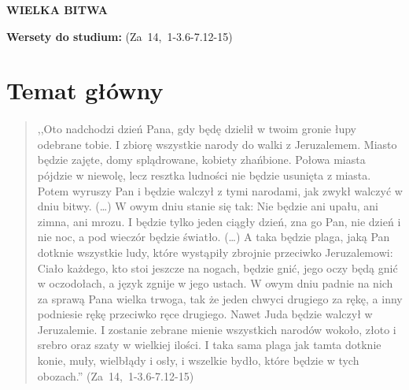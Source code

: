 \documentclass[10pt,a4paper,oneside]{article}
\begin{document}
\centerline{\textbf{\MakeUppercase{Wielka bitwa}}}
\begin{center}
\textbf{Wersety do studium:} \mbox{(Za 14, 1-3.6-7.12-15)}
\end{center}
\section{Temat główny}
\paragraph{}
\begin{quote}
,,Oto nadchodzi dzień Pana, gdy będę dzielił w twoim gronie łupy odebrane tobie. I zbiorę wszystkie narody do walki z Jeruzalemem. Miasto będzie zajęte, domy splądrowane, kobiety zhańbione. Połowa miasta pójdzie w niewolę, lecz resztka ludności nie będzie usunięta z miasta. Potem wyruszy Pan i będzie walczył z tymi narodami, jak zwykł walczyć w dniu bitwy. (\ldots) W owym dniu stanie się tak: Nie będzie ani upału, ani zimna, ani mrozu. I będzie tylko jeden ciągły dzień, zna go Pan, nie dzień i nie noc, a pod wieczór będzie światło. (\ldots) A taka będzie plaga, jaką Pan dotknie wszystkie ludy, które wystąpiły zbrojnie przeciwko Jeruzalemowi: Ciało każdego, kto stoi jeszcze na nogach, będzie gnić, jego oczy będą gnić w oczodołach, a język zgnije w jego ustach. W owym dniu padnie na nich za sprawą Pana wielka trwoga, tak że jeden chwyci drugiego za rękę, a inny podniesie rękę przeciwko ręce drugiego. Nawet Juda będzie walczył w Jeruzalemie. I zostanie zebrane mienie wszystkich narodów wokoło, złoto i srebro oraz szaty w wielkiej ilości. I taka sama plaga jak tamta dotknie konie, muły, wielbłądy i osły, i wszelkie bydło, które będzie w tych obozach.'' \mbox{(Za 14, 1-3.6-7.12-15)}
\end{quote}
\end{document}
